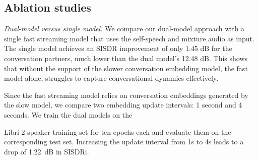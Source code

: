 {%


\subsection{Ablation studies}\label{sec:ablation}

\noindent\textit{Dual-model versus single model.} We compare our dual-model approach with a single fast streaming model that uses the self-speech and mixture audio as input. The single model achieves an SISDR improvement of only 1.45 dB for the conversation partners, much lower than the dual model's 12.48 dB. This shows that without the support of the slower conversation embedding model, the fast model alone, struggles to capture conversational dynamics effectively. 


\vskip 0.02in Since the fast streaming model relies on conversation embeddings generated by the slow model, we compare two embedding update intervals: 1 second and 4 seconds. We train the dual models on the {Libri 2-speaker  training set for ten epochs each and evaluate them on the corresponding test set. Increasing the update interval from 1s to 4s leads to a drop of 1.22~dB in SISDRi. %



}}
